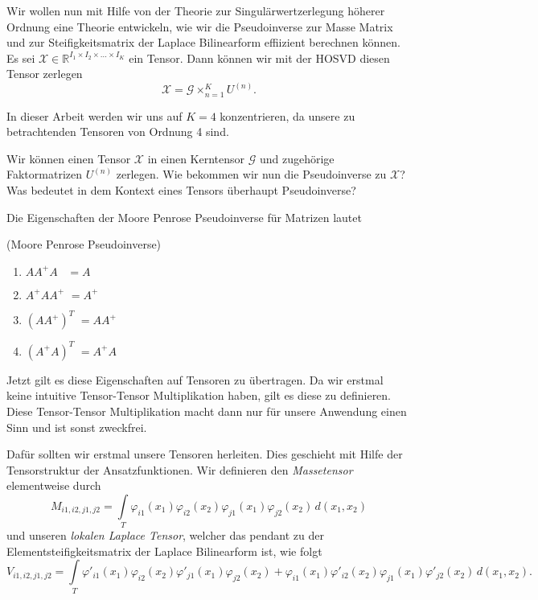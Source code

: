 Wir wollen nun mit Hilfe von der Theorie zur Singulärwertzerlegung höherer Ordnung eine Theorie entwickeln, wie wir die Pseudoinverse zur Masse Matrix und zur Steifigkeitsmatrix der Laplace Bilinearform effiizient berechnen können. 
Es sei $\pmb{\mathscr{X}}  \in \mathbb{R}^{I_1 \times I_2 \times \dots \times I_K}$ ein Tensor. Dann können wir mit der HOSVD diesen Tensor zerlegen
\begin{equation}
\pmb{\mathscr{X}} = \pmb{\mathscr{G}} \times_{n=1}^{K} U^{ (n) }.
\end{equation}

In dieser Arbeit werden wir uns auf $K=4$ konzentrieren, da unsere zu betrachtenden Tensoren von Ordnung 4 sind.

Wir können einen Tensor $\pmb{\mathscr{X}}$ in einen Kerntensor $\pmb{\mathscr{G}}$ und zugehörige Faktormatrizen $U^{(n)}$ zerlegen. Wie bekommen wir nun die Pseudoinverse zu $\pmb{\mathscr{X}}$? Was bedeutet in dem Kontext eines Tensors überhaupt Pseudoinverse?

Die Eigenschaften der Moore Penrose Pseudoinverse für Matrizen lautet
\begin{Lemma} (Moore Penrose Pseudoinverse) \label{lemma:penrose}
\begin{enumerate}
\item $AA^{+}A \, \, \, \, \,  =A$
\item $A^{+}AA^{+} \, \, =A^{+}$ 
\item $(AA^{+})^{T} \, \,  =AA^{+}$
\item $(A^{+}A)^{T} \, \, =A^{+}A$ 
\end{enumerate}
\end{Lemma}

Jetzt gilt es diese Eigenschaften auf Tensoren zu übertragen. Da wir erstmal keine intuitive Tensor-Tensor Multiplikation haben, gilt es diese zu definieren. Diese Tensor-Tensor Multiplikation macht dann nur für unsere Anwendung einen Sinn und ist sonst zweckfrei.

Dafür sollten wir erstmal unsere Tensoren herleiten. Dies geschieht mit Hilfe der Tensorstruktur der Ansatzfunktionen.
Wir definieren den \textit{Massetensor} elementweise durch
\begin{equation} 
M_{i1,i2,j1,j2} = \int\limits_{T} \varphi_{i1} (x_1) \varphi_{i2}(x_2) \varphi_{j1} (x_1) \varphi_{j2} (x_2) \, d(x_1,x_2)
\end{equation}
und unseren \textit{lokalen Laplace Tensor}, welcher das pendant zu der Elementsteifigkeitsmatrix der Laplace Bilinearform ist, wie folgt
\begin{equation} 
V_{i1,i2,j1,j2} = \int\limits_{T} \varphi'_{i1} (x_1) \varphi_{i2}(x_2) \varphi'_{j1} (x_1) \varphi_{j2} (x_2) +
\varphi_{i1} (x_1) \varphi'_{i2}(x_2) \varphi_{j1} (x_1) \varphi'_{j2} (x_2) \, d(x_1,x_2).
\end{equation}

